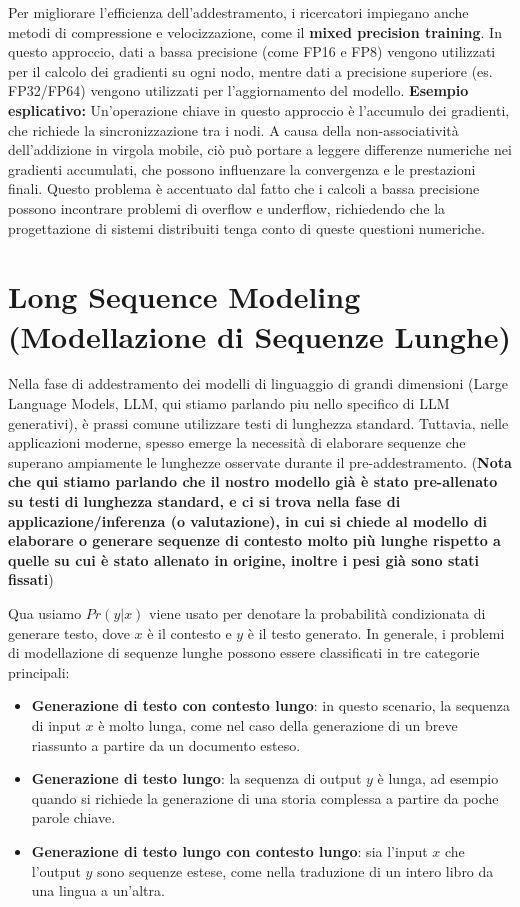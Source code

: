 Per migliorare l'efficienza dell'addestramento, i ricercatori impiegano anche metodi di compressione e velocizzazione, come il \textbf{mixed precision training}. In questo approccio, dati a bassa precisione (come FP16 e FP8) vengono utilizzati per il calcolo dei gradienti su ogni nodo, mentre dati a precisione superiore (es. FP32/FP64) vengono utilizzati per l'aggiornamento del modello.
\textbf{Esempio esplicativo:} Un'operazione chiave in questo approccio è l'accumulo dei gradienti, che richiede la sincronizzazione tra i nodi. A causa della non-associatività dell'addizione in virgola mobile, ciò può portare a leggere differenze numeriche nei gradienti accumulati, che possono influenzare la convergenza e le prestazioni finali. Questo problema è accentuato dal fatto che i calcoli a bassa precisione possono incontrare problemi di overflow e underflow, richiedendo che la progettazione di sistemi distribuiti tenga conto di queste questioni numeriche.

\section{Long Sequence Modeling (Modellazione di Sequenze Lunghe)}

Nella fase di addestramento dei modelli di linguaggio di grandi dimensioni (Large Language Models, LLM, qui stiamo parlando piu nello specifico di LLM generativi), è prassi comune utilizzare testi di lunghezza standard. Tuttavia, nelle applicazioni moderne, spesso emerge la necessità di elaborare sequenze che superano ampiamente le lunghezze osservate durante il pre-addestramento.
(\textbf{Nota che qui stiamo parlando che il nostro modello già è stato pre-allenato su testi di lunghezza standard, e ci si trova nella fase di applicazione/inferenza (o valutazione), in cui si chiede al modello di elaborare o generare sequenze di contesto molto più lunghe rispetto a quelle su cui è stato allenato in origine, inoltre i pesi già sono stati fissati})

Qua usiamo $Pr(y|x)$ viene usato per denotare la probabilità condizionata di generare testo, dove $x$ è il contesto e $y$ è il testo generato.
In generale, i problemi di modellazione di sequenze lunghe possono essere classificati in tre categorie principali:
\begin{itemize}
\item \textbf{Generazione di testo con contesto lungo}: in questo scenario, la sequenza di input $x$ è molto lunga, come nel caso della generazione di un breve riassunto a partire da un documento esteso.
\item \textbf{Generazione di testo lungo}: la sequenza di output $y$ è lunga, ad esempio quando si richiede la generazione di una storia complessa a partire da poche parole chiave.
\item \textbf{Generazione di testo lungo con contesto lungo}: sia l'input $x$ che l'output $y$ sono sequenze estese, come nella traduzione di un intero libro da una lingua a un'altra.
\end{itemize}

